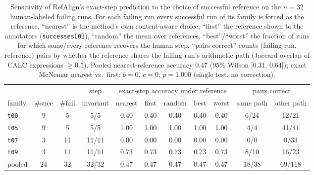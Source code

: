 \begin{table}[t]
\centering\small
\begin{tabular}{lcccccccccc}
\toprule
 & & & step & \multicolumn{5}{c}{exact-step accuracy under reference} & \multicolumn{2}{c}{pairs correct} \\
\cmidrule(lr){5-9} \cmidrule(lr){10-11}
family & \#succ & \#fail & invariant & nearest & first & random & best & worst & same path & other path \\
\midrule
\texttt{t00} & 9 & 5 & 5/5 & 0.40 & 0.40 & 0.40 & 0.40 & 0.40 & 6/24 & 12/21 \\
\texttt{t05} & 9 & 5 & 5/5 & 1.00 & 1.00 & 1.00 & 1.00 & 1.00 & 4/4 & 41/41 \\
\texttt{t07} & 3 & 11 & 11/11 & 0.00 & 0.00 & 0.00 & 0.00 & 0.00 & 0/0 & 0/33 \\
\texttt{t09} & 3 & 11 & 11/11 & 0.73 & 0.73 & 0.73 & 0.73 & 0.73 & 8/10 & 16/23 \\
\midrule
pooled & 24 & 32 & 32/32 & 0.47 & 0.47 & 0.47 & 0.47 & 0.47 & 18/38 & 69/118 \\
\bottomrule
\end{tabular}
\caption{Sensitivity of RefAlign's exact-step prediction to the choice of successful
reference on the $n{=}32$ human-labeled failing runs. For each failing run every
successful run of its family is forced as the reference. ``nearest'' is the method's
own content-aware choice, ``first'' the reference shown to the annotators
(\texttt{successes[0]}), ``random'' the mean over references, ``best''/``worst'' the
fraction of runs for which some/every reference recovers the human step. ``pairs
correct'' counts (failing run, reference) pairs by whether the reference shares the
failing run's arithmetic path (Jaccard overlap of CALC expressions $\ge 0.5$).
Pooled nearest-reference accuracy 0.47 (95\% Wilson [0.31, 0.64]);
exact McNemar nearest vs.\ first: $b{=}0$, $c{=}0$, $p{=}1.000$ (single test, no correction).}
\label{tab:reference-sensitivity}
\end{table}
